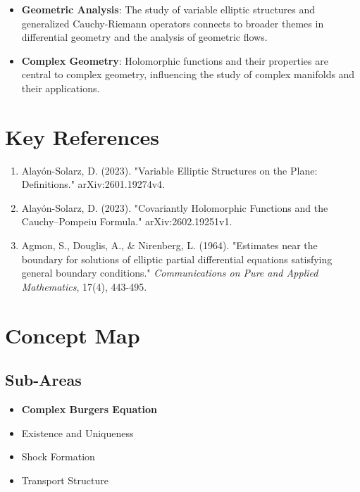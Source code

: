 \documentclass[11pt,a4paper]{article}
\begin{document}
\begin{itemize}
\item \textbf{Geometric Analysis}: The study of variable elliptic structures and generalized Cauchy-Riemann operators connects to broader themes in differential geometry and the analysis of geometric flows.
\end{itemize}

\begin{itemize}
\item \textbf{Complex Geometry}: Holomorphic functions and their properties are central to complex geometry, influencing the study of complex manifolds and their applications.
\end{itemize}

\section{Key References}

\begin{enumerate}
\item Alayón-Solarz, D. (2023). "Variable Elliptic Structures on the Plane: Definitions." arXiv:2601.19274v4.
\item Alayón-Solarz, D. (2023). "Covariantly Holomorphic Functions and the Cauchy--Pompeiu Formula." arXiv:2602.19251v1.
\item Agmon, S., Douglis, A., & Nirenberg, L. (1964). "Estimates near the boundary for solutions of elliptic partial differential equations satisfying general boundary conditions." \textit{Communications on Pure and Applied Mathematics}, 17(4), 443-495.
\end{enumerate}

\section{Concept Map}

\subsection{Sub-Areas}

\begin{itemize}
\item \textbf{Complex Burgers Equation}
\item Existence and Uniqueness
\item Shock Formation
\item Transport Structure
\end{itemize}
\end{document}
